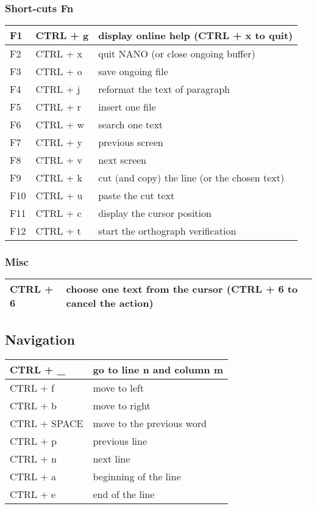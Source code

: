\documentclass[letterpaper,10pt,english]{sphinxmanual}
\begin{document}
\subsubsection{Short-cuts Fn}
\label{editor/nano:short-cuts-fn}
\begin{tabulary}{\linewidth}{|L|L|L|}
\hline

F1
 & 
CTRL + g
 & 
display online help (CTRL + x to quit)
\\
\hline
F2
 & 
CTRL + x
 & 
quit NANO (or close ongoing buffer)
\\
\hline
F3
 & 
CTRL + o
 & 
save ongoing file
\\
\hline
F4
 & 
CTRL + j
 & 
reformat the text of paragraph
\\
\hline
F5
 & 
CTRL + r
 & 
insert one file
\\
\hline
F6
 & 
CTRL + w
 & 
search one text
\\
\hline
F7
 & 
CTRL + y
 & 
previous screen
\\
\hline
F8
 & 
CTRL + v
 & 
next screen
\\
\hline
F9
 & 
CTRL + k
 & 
cut (and copy) the line (or the chosen text)
\\
\hline
F10
 & 
CTRL + u
 & 
paste the cut text
\\
\hline
F11
 & 
CTRL + c
 & 
display the cursor position
\\
\hline
F12
 & 
CTRL + t
 & 
start the orthograph verification
\\
\hline\end{tabulary}



\subsubsection{Misc}
\label{editor/nano:misc}
\begin{tabulary}{\linewidth}{|L|L|}
\hline

CTRL + 6
 & 
choose one text from the cursor (CTRL + 6 to cancel the action)
\\
\hline\end{tabulary}



\subsection{Navigation}
\label{editor/nano:navigation}
\begin{tabulary}{\linewidth}{|L|L|}
\hline

CTRL + \_
 & 
go to line n and column m
\\
\hline
CTRL + f
 & 
move to left
\\
\hline
CTRL + b
 & 
move to right
\\
\hline
CTRL + SPACE
 & 
move to the previous word
\\
\hline
CTRL + p
 & 
previous line
\\
\hline
CTRL + n
 & 
next line
\\
\hline
CTRL + a
 & 
beginning of the line
\\
\hline
CTRL + e
 & 
end of the line
\\
\hline\end{tabulary}
\end{document}
